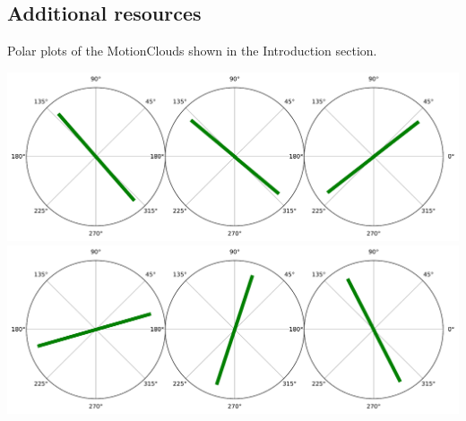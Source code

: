 \documentclass[a0,portrait]{a0poster}
\begin{document}
\begin{multicols}{3}
\section*{Additional resources}
\begin{minipage}{0.67\linewidth}
Polar plots of the MotionClouds shown in the Introduction section.
\end{minipage}
\begin{minipage}{0.3\linewidth}
\includegraphics[width=1\linewidth]{Polar_plot_MC1.pdf}
\includegraphics[width=1\linewidth]{Polar_plot_MC2.pdf}
\end{minipage}\hfil


\end{multicols}
\end{document}
